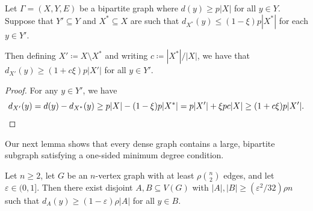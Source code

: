 \documentclass[11pt]{article}
\numberwithin{equation}{section}
\theoremstyle{plain}
\theoremstyle{remark}
\newcommand{\eps}{\ensuremath{\varepsilon}}
\newcommand\ab[1]{\lvert #1 \rvert}
\begin{document}
\begin{lemma}\label{lem:other increment}
    Let $\Gamma = (X,Y,E)$ be a bipartite graph where $d(y)\ge p|X|$ for all $y\in Y$. Suppose that $Y'\subseteq Y$ and $X^*\subseteq X$ are such that $d_{X^*}(y)\le (1-\xi)p|X^*|$ for each $y\in Y'$. 
    
    Then defining $X' \coloneqq X\setminus X^*$ and writing $c \coloneqq |X^*|/|X|$, we have that $d_{X'}(y)\ge (1+c\xi)p|X'|$ for all $y\in Y'$.  
\end{lemma}
\begin{proof}For any $y \in Y'$, we have
\[
d_{X'}(y) = d(y)-d_{X^*}(y) \ge p|X|-(1-\xi)p|X^*|= p|X'|+\xi p c|X| \ge (1+c\xi)p|X'|.\qedhere
\]
\end{proof}
Our next lemma shows that every dense graph contains a large, bipartite subgraph satisfying a one-sided minimum degree condition.
\begin{lemma}\label{lem:dense to bipartite}
    Let $n \geq 2$, let $G$ be an $n$-vertex graph with at least $\rho \binom n2$ edges, and let $\eps\in (0,1]$. Then there exist disjoint $A,B \subseteq V(G)$ with $\ab A, \ab B \geq (\eps^2/32)\rho n$ such that $d_A(y) \geq (1-\eps)\rho \ab A$ for all $y \in B$.
\end{lemma}
\end{document}
